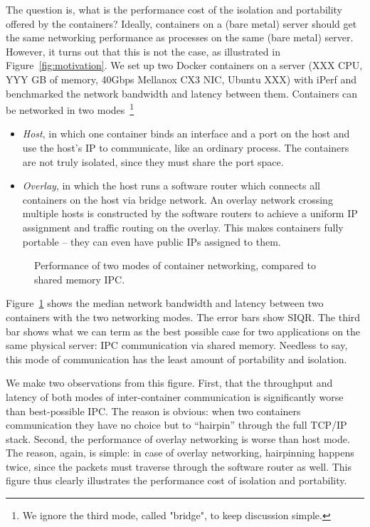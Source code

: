 The question is, what is the performance cost of the isolation and portability
offered by the containers? Ideally, containers on a (bare metal) server should
get the same networking performance as processes on the same (bare metal)
server. However, it turns out that this is not the case, as illustrated in
Figure~\ref{fig:motivation}.  We set up two Docker
containers on a server (XXX CPU, YYY GB of memory, 40Gbps Mellanox CX3 NIC, Ubuntu
XXX) with iPerf and benchmarked the network bandwidth and latency between
them. Containers can be networked in two modes~\footnote{We ignore the third
mode, called "bridge", to keep discussion simple.} 
\begin{itemize}
\item {\em Host}, in which one container binds an interface and a port on the
    host and use the host's IP to communicate, like an ordinary process. The
    containers are not truly isolated, since they must share the port space.
\item {\em Overlay}, in which the host runs a software router which connects
    all containers on the host via bridge network. An overlay network crossing
    multiple hosts is constructed by the software routers to achieve a uniform
    IP assignment and traffic routing on the overlay. This makes containers
    fully portable -- they can even have public IPs assigned to them.
\end{itemize}

\begin{figure}[ht]
     \centering 
     \label{fig:three_modes}
     \caption{Performance of two modes of container networking, compared to
     shared memory IPC.} 
\end{figure} 

Figure~\ref{fig:three_modes} shows the median network bandwidth and latency
between two containers with the two networking modes. The error bars show SIQR.
The third bar shows what we can term as the best possible case for two
applications on the same physical server: IPC communication via shared memory.
Needless to say, this mode of communication has the least amount of portability
and isolation.

We make two observations from this figure. First, that the throughput and
latency of both modes of inter-container communication is significantly worse
than best-possible IPC. The reason is obvious: when two containers communication
they have no choice but to ``hairpin'' through the full TCP/IP stack. Second,
the performance of overlay networking is worse than host mode. The reason, again,
is simple: in case of overlay networking, hairpinning happens twice, since the
packets must traverse through the software router as well. This figure thus
clearly illustrates the performance cost of isolation and portability.

